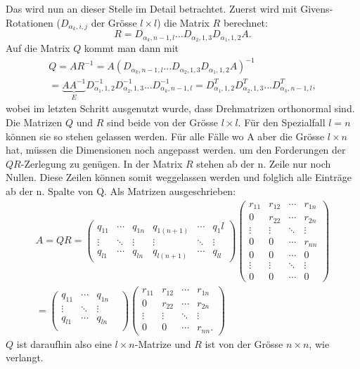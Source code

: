 Das wird nun an dieser Stelle im Detail betrachtet.
Zuerst wird mit Givens-Rotationen ($D_{\alpha_k, i, j}$ der Grösse $l\times l$) die Matrix $R$ berechnet: 
\begin{equation*}
R = D_{\alpha_k,n-1,l}...D_{\alpha_2,1,3}D_{\alpha_1,1,2}A.		
\end{equation*}
Auf die Matrix $Q$ kommt man dann mit
\begin{multline*}
Q=AR^{-1}=A(D_{\alpha_k,n-1,l}...D_{\alpha_2,1,3}D_{\alpha_1,1,2}A)^{-1}\\=
\underbrace{AA^{-1}}_{E}D_{\alpha_1,1,2}^{-1}D_{\alpha_2,1,3}^{-1}... D_{\alpha_k, n-1,l}^{-1}=
D_{\alpha_1,1,2}^{T}D_{\alpha_2,1,3}^{T}...D_{\alpha_k, n-1,l}^{T},
\end{multline*}
wobei im letzten Schritt ausgenutzt wurde, dass Drehmatrizen orthonormal sind.
Die Matrizen $Q$ und $R$ sind beide von der Grösse $l\times l$.
Für den Spezialfall $l=n$ können sie so stehen gelassen werden.
Für alle Fälle wo A aber die Grösse $l\times n$ hat, müssen die Dimensionen noch angepasst werden. um den Forderungen der $QR$-Zerlegung zu genügen.
In der Matrix $R$ stehen ab der n. Zeile nur noch Nullen.
Diese Zeilen können somit weggelassen werden und folglich alle Einträge ab der n. Spalte von Q.
Als Matrizen ausgeschrieben:
\begin{multline*}
A=QR=
\begin{pmatrix}
q_{11}&\cdots&q_{1n}&q_{1(n+1)}&\cdots&q_1l\\
\vdots&\ddots&\vdots&\vdots    &\ddots&\vdots\\
q_{l1}&\cdots&q_{ln}&q_{l(n+1)}&\cdots&q_{ll}
\end{pmatrix}
\begin{pmatrix}
r_{11}&r_{12}&\cdots&r_{1n}\\
0     &r_{22}&\cdots&r_{2n}\\
\vdots&\vdots&\ddots&\vdots\\
0     &0     &\cdots&r_{nn}\\
0     &0     &\cdots&0\\
\vdots&\vdots&\ddots&\vdots\\
0     &0     &\cdots&0
\end{pmatrix}\\=
\begin{pmatrix}
q_{11}&\cdots&q_{1n}&\\
\vdots&\ddots&\vdots&\\
q_{l1}&\cdots&q_{ln}\\
\end{pmatrix}
\begin{pmatrix}
r_{11}&r_{12}&\cdots&r_{1n}\\
0     &r_{22}&\cdots&r_{2n}\\
\vdots&\vdots&\ddots&\vdots\\
0     &0     &\cdots&r_{nn}.
\end{pmatrix}
\end{multline*}
$Q$ ist daraufhin also eine $l\times n$-Matrize und $R$ ist von der Grösse $n\times n$, wie verlangt.

